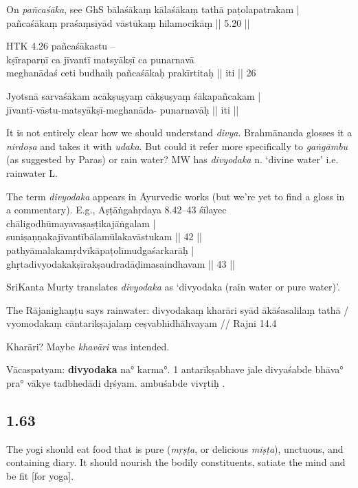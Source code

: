 \begin{ekdosis}
\begin{philcomm}[hp01_062]
On \emph{pañcaśāka}, see GhS  
\startverse
bālaśākaṃ kālaśākaṃ tathā paṭolapatrakam |\\
pañcaśākaṃ praśaṃsīyād vāstūkaṃ hilamocikāṃ || 5.20 ||
\endverse

HTK 4.26
\startverse
pañcaśākastu –\\
kṣīraparṇī ca jīvantī matsyākṣī ca punarnavā \\
meghanādaś ceti budhaiḥ pañcaśākaḥ prakīrtitaḥ || iti || 26
\endverse

Jyotsnā
\startverse
sarvaśākam acākṣuṣyaṃ cākṣuṣyaṃ śākapañcakam |\\
jīvantī-vāstu-matsyākṣī-meghanāda- punarnavāḥ || iti ||
\endverse

It is not entirely clear how we should understand \emph{divya}. Brahmānanda glosses it a \emph{nirdoṣa} and takes it with \emph{udaka}. But could it refer more specifically to \emph{gaṅgāmbu} (as suggested by Paras) or rain water? MW has \emph{divyodaka} n. `divine water' i.e. rainwater L.

The term \emph{divyodaka} appears in Āyurvedic works (but we’re yet to find a gloss in a commentary). E.g.,
Aṣṭāṅgahṛdaya 8.42–43
\startverse
śīlayec chāligodhūmayavaṣaṣṭikajāṅgalam |\\
suniṣaṇṇakajīvantībālamūlakavāstukam || 42 ||\\
pathyāmalakamṛdvīkāpaṭolīmudgaśarkarāḥ |\\
ghṛtadivyodakakṣīrakṣaudradāḍimasaindhavam || 43 ||
\endverse

SriKanta Murty translates \emph{divyodaka} as ‘divyodaka (rain water or pure water)'.

The Rājanighaṇṭu says rainwater:
\startverse
divyodakaṃ kharāri syād ākāśasalilaṃ tathā /\\
vyomodakaṃ cāntarikṣajalaṃ ceṣvabhidhāhvayam // \textup{Rajni 14.4}
\endverse

Kharāri? Maybe \emph{khavāri} was intended.

Vācaspatyam:
\textbf{divyodaka} na° karma°.
1 antarīkṣabhave jale divyaśabde bhāva° pra° vākye tadbhedādi dṛśyam.
ambuśabde vivṛtiḥ .
\end{philcomm}

\subsection*{1.63}
\begin{translation}[hp01_063]
The yogi should eat food that is pure (\emph{mṛṣṭa}, or delicious \emph{miṣṭa}), unctuous, and containing diary. It should nourish the bodily constituents, satiate the mind and be fit [for yoga].
\end{translation}


\end{ekdosis}
